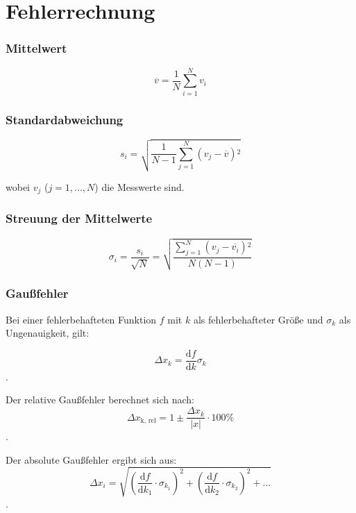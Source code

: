 \section{Fehlerrechnung}
\label{subsec:fehlerrechnung}

\subsubsection{Mittelwert}
\begin{equation}
\overline{v} = \frac{1}{N} \sum_{i=1}^N v_i
\end{equation}

\subsubsection{Standardabweichung}
\begin{equation}
s_i = \sqrt{\frac{1}{N - 1} \sum_{j=1}^N \left(v_j - \overline{v}\right){^2}}
\end{equation}

wobei $v_j$ ($j = 1, ..., N$) die Messwerte sind.

\subsubsection{Streuung der Mittelwerte}
\begin{equation}
\sigma_i = \frac{s_i}{\sqrt{N}} = \sqrt{\frac{\sum_{j=1}^N \left(v_j - \overline{v_i}\right){^2}}{N \left(N - 1 \right)}}
\end{equation}

\subsubsection{Gaußfehler}
Bei einer fehlerbehafteten Funktion $f$ mit $k$ als fehlerbehafteter Größe und $\sigma_k$ als Ungenauigkeit, gilt:

\begin{equation}
\Delta x_k = \frac{\mathrm{d}f}{\mathrm{d}k}\sigma_k
\end{equation}.

 Der relative Gaußfehler berechnet sich nach:
\begin{equation}
\Delta x_\text{k, rel} = 1 \pm \frac{\Delta x_k}{|x|}\cdot 100\%
\end{equation}.

Der absolute Gaußfehler ergibt sich aus:
\begin{equation}
\Delta x_i = \sqrt{\left(\frac{\mathrm{d}f}{\mathrm{d}k_{1}}\cdot \sigma_{k_{1}}\right)^2 + \left(\frac{\mathrm{d}f}{\mathrm{d}k_{2}}\cdot \sigma_{k_{2}}\right)^2 + ...}
\end{equation}.
